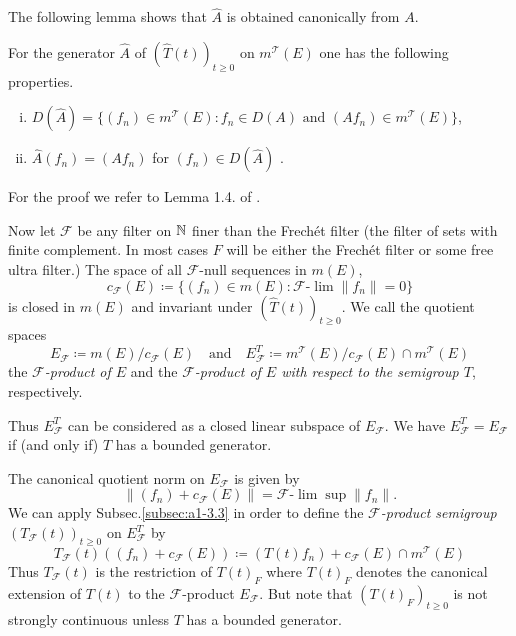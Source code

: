 The following lemma shows that $\hat{A}$ is obtained canonically from $A$.
\begin{lemma}\label{lem:a1-3.6}
For the generator $\hat{A}$ of $(\hat{T}(t))_{t \geq 0}$ on $m^{\mathcal{T}}(E)$ one has the following properties.
\begin{enumerate}[(i)]

\item 
$D(\hat{A}) = \{(f_{n}) \in m^{\mathcal{T}}(E) \colon f_{n} \in D(A) \text{ and } (Af_{n}) \in m^{\mathcal{T}}(E)\}$,

\item 
$\hat{A}(f_{n}) = (Af_{n})$ for $(f_{n}) \in D(\hat{A})$ .
\end{enumerate}

\end{lemma}
For the proof we refer to Lemma 1.4. of \citet{derndinger:1980}.

Now let $\mathcal{F}$ be any filter on $\mathbb{N}$ finer than the Frechét filter (\ie the filter of sets with finite complement. In most cases $F$ will be either the Frechét filter or some free ultra filter.)
The space of all $\mathcal{F}$-null sequences in $m(E)$, \ie
\[
    c_{\mathcal{F}}(E) \coloneqq \{(f_{n}) \in m(E) \colon \mathcal{F}\text{-}\lim\|f_{n}\| = 0\}
\]
is closed in $m(E)$ and invariant under $(\hat{T}(t))_{t \geq 0}$. 
We call the quotient spaces
\[
    E_{\mathcal{F}} \coloneqq m(E)/c_{\mathcal{F}}(E) \quad \text{and} \quad E_{\mathcal{F}}^{T} \coloneqq m^{\mathcal{T}}(E)/c_{\mathcal{F}}(E)\cap m^{\mathcal{T}}(E)
\]
the \emph{$\mathcal{F}$-product of $E$} and the \emph{$ \mathcal{F} $-product of $E$ with respect to the semigroup $T$}, respectively.

Thus $E_{\mathcal{F}}^{T}$ can be considered as a closed linear subspace of $E_{\mathcal{F}}$. 
We have $E_{\mathcal{F}}^{T} = E_{\mathcal{F}}$ if (and only if) $T$ has a bounded generator.

The canonical quotient norm on $E_{\mathcal{F}}$ is given by
\[
    \|(f_{n}) + c_{\mathcal{F}}(E)\| = \mathcal{F}\text{-}\lim \sup \|f_{n}\| .
\]
We can apply Subsec.\;\ref{subsec:a1-3.3} in order to define the \emph{$\mathcal{F}$-product semigroup} $(T_{\mathcal{F}}(t))_{t \geq 0}$ on $E_{\mathcal{F}}^{T}$ by
\[
    T_{\mathcal{F}}(t)((f_{n}) + c_{\mathcal{F}}(E)) \coloneqq (T(t)f_{n}) 
    	+ c_{\mathcal{F}}(E)\cap m^{\mathcal{T}}(E)
\]
Thus $T_{\mathcal{F}}(t)$ is the restriction of $T(t)_{F}$ where $T(t)_{F}$ denotes the canonical extension of $T(t)$ to the $\mathcal{F}$-product $E_{\mathcal{F}}$. 
But note that $(T(t)_{F})_{t \geq 0}$ is not strongly continuous unless $T$ has a bounded generator.

